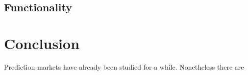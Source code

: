 \documentclass[bsc,frontabs,twoside,singlespacing,parskip,deptreport]{infthesis}     %
\begin{document}
\section{Functionality}

\chapter{Conclusion}
	Prediction markets have already been studied for a while. Nonetheless there are 






\end{document}

